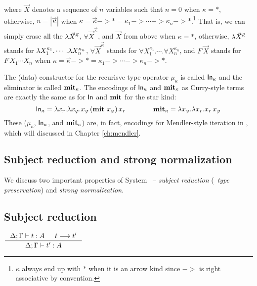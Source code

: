 where $\vec{X}$ denotes a sequence of $n$ variables
such that $n=0$ when $\kappa = *$, otherwise, $n = |\vec{\kappa}|$ when
$\kappa = \vec{\kappa} -> * = \kappa_1 -> \cdots -> \kappa_n -> *$.\footnote{
        $\kappa$ always end up with $*$ when it is an arrow kind
        since $->$ is right associative by convention.}
That is, we can simply erase all the $\lambda \vec{X}^{\vec{\kappa}}$,
$\forall \vec{X}^{\vec{\kappa}}$, and $\vec{X}$ from above when
$\kappa = *$, otherwise, $\lambda \vec{X}^{\vec{\kappa}}$ stands for
$\lambda X_1^{\kappa_1}.\cdots.\lambda X_n^{\kappa_n}$,
$\forall \vec{X}^{\vec{\kappa}}$ stands for
$\forall X_1^{\kappa_1}.\cdots.\forall X_n^{\kappa_n}$,
and $F\,\vec{X}$ stands for $F\,X_1\cdots X_n$
when $\kappa = \vec{\kappa} -> * = \kappa_1 -> \cdots -> \kappa_n -> *$.

The (data) constructor for the recurisve type operator $\mu_\kappa$ is
called $\mathsf{In}_\kappa$ and the eliminator is called $\mathbf{mit}_\kappa$.
The encodings of $\mathsf{In}_\kappa$ and $\mathbf{mit}_\kappa$ as Curry-style terms are
exactly the same as for $\mathsf{In}$ and $\mathbf{mit}$ for the star kind:
\[ \mathsf{In}_\kappa = \lambda x_r. \lambda x_\varphi.x_\varphi\,(\mathbf{mit}~x_\varphi)\,x_r
\qquad\qquad \mathbf{mit}_\kappa = \lambda x_\varphi.\lambda x_r.x_r\,x_\varphi \]
These ($\mu_\kappa$, $\mathsf{In}_\kappa$, and $\mathbf{mit}_\kappa$) are, in fact,
encodings for Mendler-style iteration in \Fw, which will discussed in
Chapter \ref{ch:mendler}. %



\subsection{Subject reduction and strong normalization}\label{sec:fw:srsn}
We discuss two important properties of System \Fw\ --
\emph{subject reduction} (\aka\ \emph{type preservation})
and \emph{strong normalization}.

\subsection*{Subject reduction}
\begin{theorem}
$\inference{\Delta;\Gamma |- t : A  & t --> t'}{\Delta;\Gamma |- t' : A}$
\end{theorem}


